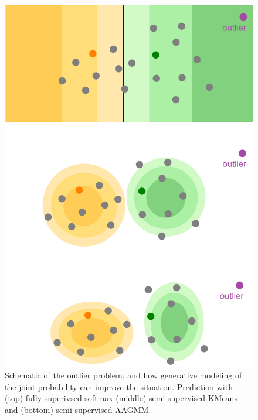 \documentclass[10pt,twocolumn,letterpaper]{article}
\begin{document}
\begin{figure}[ht]
	\centering
	
	\includegraphics[width=0.75\linewidth]{figures/illustration.png}
	\caption{Schematic of the outlier problem, and how generative modeling of the joint probability can improve the situation.  Prediction with (top) fully-superivsed softmax (middle) semi-supervised KMeans and (bottom) semi-supervised AAGMM.} 
	\label{fig:schema}
\end{figure}
\end{document}
